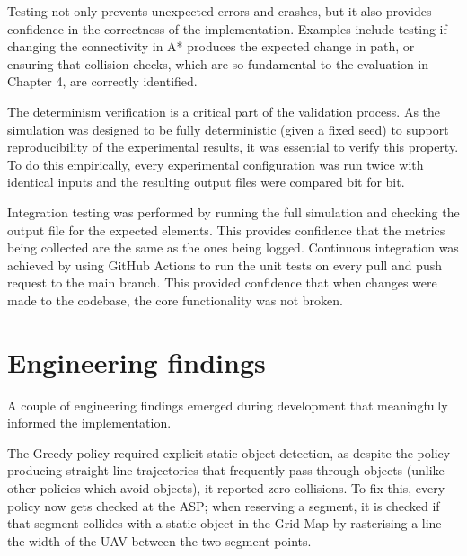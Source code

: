 \vspace{1em}

Testing not only prevents unexpected errors and crashes, but it also provides confidence in the correctness of the implementation. Examples include testing if changing the connectivity in A* produces the expected change in path, or ensuring that collision checks, which are so fundamental to the evaluation in Chapter 4, are correctly identified. \par

\vspace{1em}

The determinism verification is a critical part of the validation process. As the simulation was designed to be fully deterministic (given a fixed seed) to support reproducibility of the experimental results, it was essential to verify this property. To do this empirically, every experimental configuration was run twice with identical inputs and the resulting output files were compared bit for bit. \par

\vspace{1em}

Integration testing was performed by running the full simulation and checking the output file for the expected elements. This provides confidence that the metrics being collected are the same as the ones being logged. Continuous integration was achieved by using GitHub Actions to run the unit tests on every pull and push request to the main branch. This provided confidence that when changes were made to the codebase, the core functionality was not broken. \par

\vspace{1em}

\section{Engineering findings}

A couple of engineering findings emerged during development that meaningfully informed the implementation.\par

\vspace{1em}

The Greedy policy required explicit static object detection, as despite the policy producing straight line trajectories that frequently pass through objects (unlike other policies which avoid objects), it reported zero collisions. To fix this, every policy now gets checked at the ASP; when reserving a segment, it is checked if that segment collides with a static object in the Grid Map by rasterising a line the width of the UAV between the two segment points. \par

